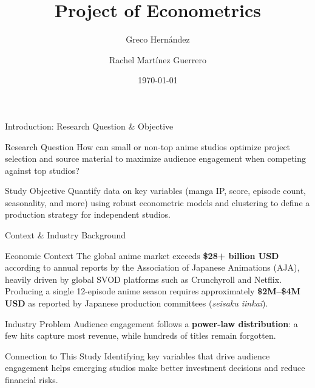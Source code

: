 \documentclass[aspectratio=169,11pt]{beamer}
\title{Project of Econometrics}
\author{Greco Hernández \and Rachel Martínez Guerrero}
\institute{Anime Research}
\date{\today}
\begin{document}
\begin{frame}
  \titlepage
\end{frame}

\begin{frame}{Introduction: Research Question \& Objective}
  \begin{block}{Research Question}
    How can small or non-top anime studios optimize project selection and
    source material to maximize audience engagement when competing against
    top studios?
  \end{block}
  \begin{block}{Study Objective}
    Quantify data on key variables (manga IP, score, episode count,
    seasonality, and more) using robust econometric models and clustering to
    define a production strategy for independent studios.
  \end{block}
\end{frame}

\begin{frame}{Context \& Industry Background}
  \small
  \begin{block}{Economic Context}
    The global anime market exceeds \textbf{\$28+ billion USD} according to
    annual reports by the Association of Japanese Animations (AJA), heavily
    driven by global SVOD platforms such as Crunchyroll and Netflix.
    Producing a single 12-episode anime season requires approximately
    \textbf{\$2M--\$4M USD} as reported by Japanese production committees
    (\textit{seisaku iinkai}).
  \end{block}
  \begin{block}{Industry Problem}
    Audience engagement follows a \textbf{power-law distribution}: a few hits
    capture most revenue, while hundreds of titles remain forgotten.
  \end{block}
  \begin{block}{Connection to This Study}
    Identifying key variables that drive audience engagement helps emerging
    studios make better investment decisions and reduce financial risks.
  \end{block}
\end{frame}
\end{document}
